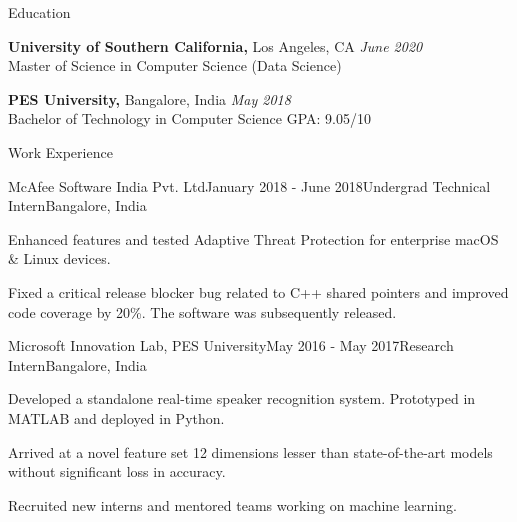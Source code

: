 \documentclass{resume} %
\begin{document}

\begin{rSection}{Education}

{\bf University of Southern California,} {Los Angeles, CA} \hfill {\em June 2020} 
\\ Master of Science in Computer Science (Data Science) \hfill { }  

{\bf PES University,}{ Bangalore, India} \hfill {\em May 2018} 
\\ Bachelor of Technology in Computer Science \hfill {GPA: 9.05/10 }  



\end{rSection}


\begin{rSection}{Work Experience}

\begin{rSubsection}{McAfee Software India Pvt. Ltd}{January 2018 - June 2018}{Undergrad Technical Intern}{Bangalore, India}

\item Enhanced features and tested Adaptive Threat Protection for enterprise macOS \& Linux devices.
\item Fixed a critical release blocker bug related to C++ shared pointers and improved code coverage by 20\%. The software was subsequently released.
\end{rSubsection}


\begin{rSubsection}{Microsoft Innovation Lab, PES University}{May 2016 - May 2017}{Research Intern}{Bangalore, India}
\item Developed a standalone real-time speaker recognition system. Prototyped in MATLAB and deployed in Python. 
\item Arrived at a novel feature set 12 dimensions lesser than state-of-the-art models without significant loss in accuracy.
\item Recruited new interns and mentored teams working on machine learning.
\end{rSubsection}

\end{rSection}
\end{document}
